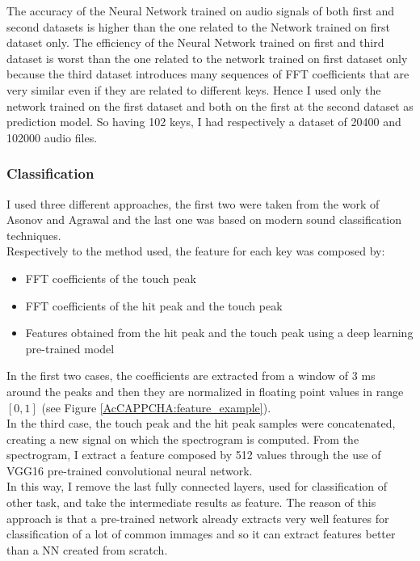 The accuracy of the Neural Network trained on audio signals of both first and second datasets is higher than the one related to the Network trained on first dataset only.  The efficiency of the Neural Network trained on first and third dataset is worst than the one related to the network trained on first dataset only because the third dataset introduces many sequences of FFT coefficients that are very similar even if they are related to different keys. Hence I used only the network trained on the first dataset and both on the first at the second dataset as prediction model. So having 102 keys, I had respectively a dataset of 20400 and 102000 audio files.

\subsubsection{Classification}
I used three different approaches, the first two were taken from the work of Asonov and Agrawal and the last one was based on modern sound classification techniques.\\
Respectively to the method used, the feature for each key was composed by:
\begin{itemize}
\item{FFT coefficients of the touch peak}
\item{FFT coefficients of the hit peak and the touch peak}
\item{Features obtained from the hit peak and the touch peak using a deep learning pre-trained model}
\end{itemize}
In the first two cases, the coefficients are extracted from a window of 3 ms around the peaks and then they are normalized in floating point values in range $[0, 1]$ (see Figure \ref{AcCAPPCHA:feature_example}).\\
In the third case, the touch peak and the hit peak samples were concatenated, creating a new signal on which the spectrogram is computed. From the spectrogram, I extract a feature composed by 512 values through the use of VGG16 pre-trained convolutional neural network.\\
In this way, I remove the last fully connected layers, used for classification of other task, and take the intermediate results as feature. The reason of this approach is that a pre-trained network already extracts very well features for classification of a lot of common immages and so it can extract features better than a NN created from scratch.

